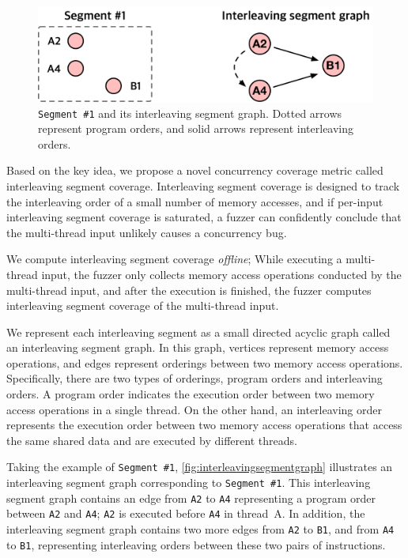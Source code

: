 \newcommand{\mutable}{mutable edge\xspace}
\newcommand{\mutables}{mutable edges\xspace}
\newcommand{\immutable}{immutable edge\xspace}
\newcommand{\immutables}{immutable edges\xspace}

\begin{figure}[t]
  \centering
  \includegraphics[width=0.9\linewidth]{fig/interleavingsegmentgraph.pdf}
  \caption{\texttt{Segment \#1} and its interleaving segment
    graph. Dotted arrows represent program orders, and solid arrows
    represent interleaving orders.}
  \label{fig:interleavingsegmentgraph}
\end{figure}

Based on the key idea, we propose a novel concurrency coverage metric
called interleaving segment coverage.
%
Interleaving segment coverage is designed to track the interleaving
order of a small number of memory accesses, and if per-input
interleaving segment coverage is saturated, a fuzzer can confidently
conclude that the multi-thread input unlikely causes a concurrency
bug.

We compute interleaving segment coverage \textit{offline}; While
executing a multi-thread input, the fuzzer only collects memory access
operations conducted by the multi-thread input, and after the
execution is finished, the fuzzer computes interleaving segment
coverage of the multi-thread input.


%
We represent each interleaving segment as a small directed acyclic
graph called an interleaving segment graph.
%
In this graph, vertices represent memory access operations, and edges
represent orderings between two memory access operations.
%
Specifically, there are two types of orderings, program orders and
interleaving orders.
%
A program order indicates the execution order between two memory
access operations in a single thread.
%
On the other hand, an interleaving order represents the execution
order between two memory access operations that access the same shared
data and are executed by different threads.

Taking the example of \texttt{Segment \#1},
\autoref{fig:interleavingsegmentgraph} illustrates an interleaving
segment graph corresponding to \texttt{Segment \#1}.
%
This interleaving segment graph contains an edge from \texttt{A2} to
\texttt{A4} representing a program order between \texttt{A2} and
\texttt{A4}; \texttt{A2} is executed before \texttt{A4} in thread~A.
%
In addition, the interleaving segment graph contains two more edges
from \texttt{A2} to \texttt{B1}, and from \texttt{A4} to \texttt{B1},
representing interleaving orders between these two pairs of
instructions.


